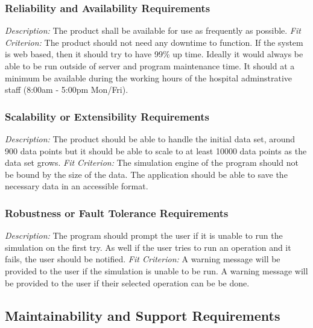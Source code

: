 \documentclass[12pt, titlepage]{article}
\begin{document}
\subsubsection{Reliability and Availability Requirements}
\textit{Description:}\newline
The product shall be available for use as frequently as possible.
\newline \newline 
\textit{Fit Criterion:}\newline 
The product should not need any downtime to function. If the system is web based, then it should try to have 99\% up time. Ideally it would always be able to be run outside of server and program maintenance time. It should at a minimum be available during the working hours of the hospital adminstrative staff (8:00am - 5:00pm Mon/Fri). 

\subsubsection{Scalability or Extensibility Requirements}
\textit{Description:}\newline
The product should be able to handle the initial data set, around 900 data points but it should be able to scale to at least 10000 data points as the data set grows.
\newline \newline 
\textit{Fit Criterion:}\newline 
The simulation engine of the program should not be bound by the size of the data. The application should be able to save the necessary data in an accessible format.

\subsubsection{Robustness or Fault Tolerance Requirements}
\textit{Description:}\newline
The program should prompt the user if it is unable to run the simulation on the first try. As well if the user tries to run an operation and it fails, the user should be notified. 
\newline \newline 
\textit{Fit Criterion:}\newline 
A warning message will be provided to the user if the simulation is unable to be run.
A warning message will be provided to the user if their selected operation can be be done.

\subsection{Maintainability and Support Requirements}
\end{document}

